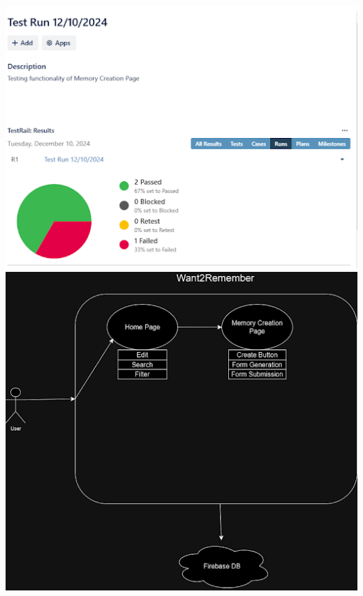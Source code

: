 \documentclass[12pt]{article}
\begin{document}
\includegraphics{snapshot2img3.png}
\includegraphics{snapshot2img4.png}
\end{document}
